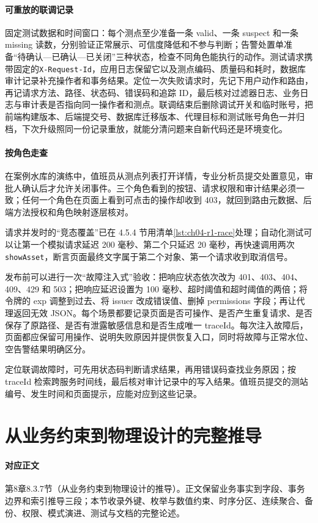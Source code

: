 \paragraph{可重放的联调记录}固定测试数据和时间窗口：每个测点至少准备一条 valid、一条 suspect 和一条 missing 读数，分别验证正常展示、可信度降低和不参与判断；告警处置单准备“待确认—已确认—已关闭”三种状态，检查不同角色能执行的动作。测试请求携带固定的\texttt{X-Request-Id}，应用日志保留它以及测点编码、质量码和耗时，数据库审计记录补充操作者和事务结果。定位一次失败请求时，先记下用户动作和路由，再记请求方法、路径、状态码、错误码和追踪 ID，最后核对过滤器日志、业务日志与审计表是否指向同一操作者和测点。联调结束后删除调试开关和临时账号，把前端构建版本、后端提交号、数据库迁移版本、代理目标和测试账号角色一并归档，下次升级照同一份记录重放，就能分清问题来自新代码还是环境变化。

\paragraph{按角色走查}在案例水库的演练中，值班员从测点列表打开详情，专业分析员提交处置意见，审批人确认后才允许关闭事件。三个角色看到的按钮、请求权限和审计结果必须一致；任何一个角色在页面上看到可点击的操作却收到 403，就回到路由元数据、后端方法授权和角色映射逐层核对。


请求并发时的“竞态覆盖”已在 4.5.4 节用清单\ref{lst:ch04-r1-race}处理；自动化测试可以让第一个模拟请求延迟 200 毫秒、第二个只延迟 20 毫秒，再快速调用两次\texttt{showAsset}，断言页面最终文字属于第二个对象、第一个请求收到取消信号。

发布前可以进行一次“故障注入式”验收：把响应状态依次改为 401、403、404、409、429 和 503；把响应延迟设置为 100 毫秒、超时阈值和超时阈值的两倍；将令牌的 exp 调整到过去、将 issuer 改成错误值、删掉 permissions 字段；再让代理返回无效 JSON。每个场景都要记录页面是否可操作、是否产生重复请求、是否保存了原路径、是否有泄露敏感信息和是否生成唯一 traceId。每次注入故障后，页面都应保留可用操作、说明失败原因并提供恢复入口，同时将故障与正常水位、空告警结果明确区分。

定位联调故障时，可先用状态码判断请求结果，再用错误码查找业务原因；按 traceId 检索跨服务时间线，最后核对审计记录中的写入结果。值班员提交的测站编号、发生时间和页面提示，应能对应到这些记录。

\section{从业务约束到物理设计的完整推导}\label{online:db-design}

\paragraph{对应正文}第8章8.3.7节（从业务约束到物理设计的推导）。正文保留业务事实到字段、事务边界和索引推导三段；本节收录外键、枚举与数值约束、时序分区、连续聚合、备份、权限、模式演进、测试与文档的完整论述。

